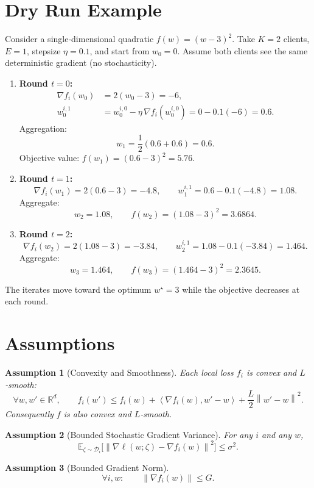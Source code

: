 \documentclass{article}
\newtheorem{assumption}{Assumption}
\newcommand{\E}{\mathbb{E}}
\newcommand{\R}{\mathbb{R}}
\newcommand{\norm}[1]{\left\lVert #1 \right\rVert}
\newcommand{\inner}[2]{\left\langle #1, #2 \right\rangle}
\newcommand{\grad}{\nabla}
\begin{document}
\section*{Dry Run Example}
Consider a single‑dimensional quadratic $f(w)=(w-3)^2$.
Take $K=2$ clients, $E=1$, stepsize $\eta=0.1$, and start from $w_0=0$.
Assume both clients see the same deterministic gradient (no stochasticity).

\begin{enumerate}[label=\arabic*.]
\item \textbf{Round $t=0$:}
\begin{align*}
\grad f_i(w_0)&=2(w_0-3) = -6,\\
w_{0}^{i,1}&=w_{0}^{i,0}-\eta\,\grad f_i(w_{0}^{i,0})
            =0-0.1(-6)=0.6 .
\end{align*}
Aggregation:
\[
w_1=\frac{1}{2}(0.6+0.6)=0.6 .
\]
Objective value: $f(w_1)=(0.6-3)^2=5.76$.

\item \textbf{Round $t=1$:}
\[
\grad f_i(w_1)=2(0.6-3)=-4.8,\qquad
w_{1}^{i,1}=0.6-0.1(-4.8)=1.08 .
\]
Aggregate:
\[
w_2=1.08,\qquad f(w_2)=(1.08-3)^2=3.6864 .
\]

\item \textbf{Round $t=2$:}
\[
\grad f_i(w_2)=2(1.08-3)=-3.84,\qquad
w_{2}^{i,1}=1.08-0.1(-3.84)=1.464 .
\]
Aggregate:
\[
w_3=1.464,\qquad f(w_3)=(1.464-3)^2=2.3645 .
\]
\end{enumerate}
The iterates move toward the optimum $w^\star=3$ while the objective decreases at each round.

\newpage
\section*{Assumptions}
\begin{assumption}[Convexity and Smoothness]\label{as:convexsmooth}
Each local loss $f_i$ is convex and $L$‑smooth:
\[
\forall w,w'\in\R^d,\qquad
f_i(w')\le f_i(w)+\inner{\grad f_i(w)}{w'-w}+\frac{L}{2}\norm{w'-w}^2 .
\]
Consequently $f$ is also convex and $L$‑smooth.
\end{assumption}

\begin{assumption}[Bounded Stochastic Gradient Variance]\label{as:variance}
For any $i$ and any $w$,
\[
\E_{\zeta\sim\mathcal D_i}\!\bigl[\norm{ \grad\ell(w;\zeta)-\grad f_i(w)}^2\bigr]\le\sigma^2 .
\]
\end{assumption}

\begin{assumption}[Bounded Gradient Norm]\label{as:boundedgrad}
\[
\forall i,w:\qquad \norm{\grad f_i(w)}\le G .
\]
\end{assumption}
\end{document}
